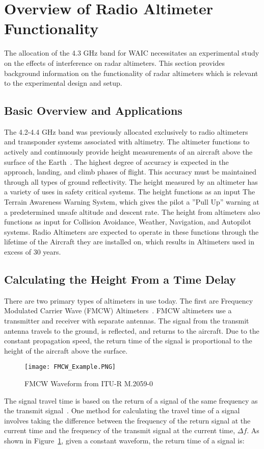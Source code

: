 \section{Overview of Radio Altimeter Functionality}
The allocation of the 4.3 GHz band for WAIC necessitates an experimental study on the effects of interference on radar altimeters. This section provides background information on the functionality of radar altimeters which is relevant to the experimental design and setup.
\subsection{Basic Overview and Applications}
The 4.2-4.4 GHz band was previously allocated exclusively to radio altimeters and transponder systems associated with altimetry. The altimeter functions to actively and continuously provide height measurements of an aircraft above the surface of the Earth~\cite{noauthor_operational_2014}. The highest degree of accuracy is expected in the approach, landing, and climb phases of flight. This accuracy must be maintained through all types of ground reflectivity. The height measured by an altimeter has a variety of uses in safety critical systems. The height functions as an input The Terrain Awareness Warning System, which gives the pilot a  ''Pull Up'' warning at a predetermined unsafe altitude and descent rate. The height from altimeters also functions as input for Collision Avoidance, Weather, Navigation, and Autopilot systems. Radio Altimeters are expected to operate in these functions through the lifetime of the Aircraft they are installed on, which results in Altimeters used in excess of 30 years.

\subsection{Calculating the Height From a Time Delay}
There are two primary types of altimeters in use today. The first are Frequency Modulated Carrier Wave (FMCW) Altimeters~\cite{noauthor_operational_2014}. FMCW altimeters use a transmitter and receiver with separate antennas. The signal from the transmit antenna travels to the ground, is reflected, and returns to the aircraft. Due to the constant propagation speed, the return time of the signal is proportional to the height of the aircraft above the surface. 


\begin{figure}
 \centering
 \texttt{[image: FMCW\_Example.PNG]}
 \caption{FMCW Waveform from ITU-R M.2059-0 ~\cite{noauthor_operational_2014}}
 \label{fig:FMCW}
\end{figure}
The signal travel time is based on the return of a signal of the same frequency as the transmit signal~\cite{noauthor_operational_2014}. One method for calculating the travel time of a signal involves taking the difference between the frequency of the return signal at the current time and the frequency of the transmit signal at the current time, $\Delta f$. As shown in Figure~\ref{fig:FMCW}, given a constant waveform, the return time of a signal is:

